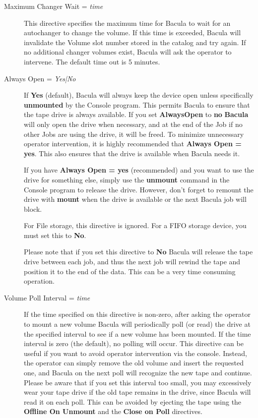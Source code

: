 \begin{description}
\item [Maximum Changer Wait = {\it time}]
   This directive specifies the maximum time for Bacula to wait  for an
autochanger to change the volume. If this time is exceeded,  Bacula will
invalidate the Volume slot number stored in  the catalog and try again. If no
additional changer volumes exist,  Bacula will ask the operator to intervene.
The default time  out is 5 minutes.

\item [Always Open = {\it Yes|No}]
   If {\bf Yes} (default), Bacula will always keep the device  open unless
specifically {\bf unmounted} by the Console program.  This permits Bacula to
ensure that the tape drive is always  available. If you set {\bf AlwaysOpen}
to {\bf no} {\bf Bacula}  will only open the drive when necessary, and at the
end of the Job  if no other Jobs are using the drive, it will be freed. To 
minimize unnecessary operator intervention, it is highly recommended  that
{\bf Always Open = yes}. This also ensures that the drive  is available when
Bacula needs it.  

If you have {\bf Always Open = yes} (recommended) and you want  to use the
drive for something else, simply use the {\bf unmount}  command in the Console
program to release the drive. However, don't  forget to remount the drive with
{\bf mount} when the drive is  available or the next Bacula job will block.  

For File storage, this directive is ignored. For a FIFO storage  device, you
must set this to {\bf No}.  

Please note that if you set this directive to {\bf No} Bacula  will release
the tape drive between each job, and thus the next job  will rewind the tape
and position it to the end of the data. This  can be a very time consuming
operation. 

\item [Volume Poll Interval = {\it time}]
   If the time  specified on this directive is non-zero, after  asking the
operator to mount a new volume Bacula will  periodically poll (or read) the
drive at the specified  interval to see if a new volume has been mounted. If
the  time interval is zero (the default), no polling will occur.  This
directive can be useful if you want to avoid operator  intervention via the
console. Instead, the operator can  simply remove the old volume and insert
the requested one,  and Bacula on the next poll will recognize the new tape
and  continue. Please be aware that if you set this interval  too small, you
may excessively wear your tape drive if the  old tape remains in the drive,
since Bacula will read it on  each poll. This can be avoided by ejecting the
tape using  the {\bf Offline On Unmount} and the {\bf Close on Poll} 
directives. 


\end{description}
